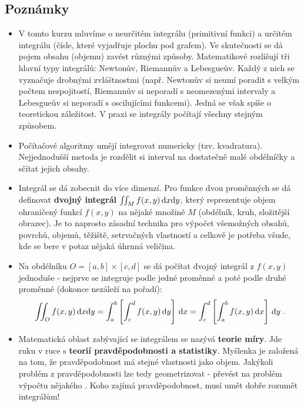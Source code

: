 \subsection*{Poznámky}

\begin{itemize}
    \item V tomto kurzu mluvíme o neurčitém integrálu (primitivní funkci) a určitém integrálu (čísle, které vyjadřuje plochu pod grafem). Ve skutečnosti se dá pojem obsahu (objemu) zavést různými způsoby. Matematikové rozlišují tři hlavní typy integrálů: Newtonův, Riemannův a Lebesgueův. Každý z nich se vyznačuje drobnými zvláštnostmi (např. Newtonův si neumí poradit s velkým počtem nespojitostí, Riemannův si neporadí s neomezenými intervaly a Lebesgueův si neporadí s oscilujícími funkcemi). Jedná se však spíše o teoretickou záležitost. V praxi se integrály počítají všechny stejným způsobem.
    \item Počítačové algoritmy umějí integrovat numericky (tzv. kvadratura). Nejjednodušší metoda je rozdělit si interval na dostatečně malé obdélníčky a sčítat jejich obsahy.
    \item Integrál se dá zobecnit do více dimenzí. Pro funkce dvou proměnných se dá definovat \textbf{dvojný integrál} $\iint_M f(x,y)\, \mathrm{d} x \mathrm{d} y$, který reprezentuje objem ohraničený funkcí $f(x,y)$ na nějaké množině $M$ (obdélník, kruh, složitější obrazec). Je to naprosto zásadní technika pro výpočet všemožných obsahů, povrchů, objemů, těžiště, setrvačných vlastností a celkově je potřeba všude, kde se bere v potaz nějaká úhrnná veličina.
    \item Na obdélníku $O = [a,b] \times [c,d]$ se dá počítat dvojný integrál z $f(x,y)$ jednoduše - nejprve se integruje podle jedné proměnné a poté podle druhé proměnné (dokonce nezáleží na pořadí):
    \begin{align}
        \iint_{O} f(x,y) \, \mathrm{d} x \mathrm{d} y = \int_a^b \left[ \int_c^d f(x,y) \, \mathrm{d} y \right] \, \mathrm{d} x = \int_c^d \left[ \int_a^b f(x,y) \, \mathrm{d} x \right] \, \mathrm{d} y \:.
    \end{align}
    \item Matematická oblast zabývající se integrálem se nazývá \textbf{teorie míry}. Jde ruku v ruce s \textbf{teorií pravděpodobnosti a statistiky}. Myšlenka je založená na tom, že pravděpodobnost má stejné vlastnosti jako objem. Jakýkoli problém z pravděpodobnosti lze tedy geometrizovat - převést na problém výpočtu nějakého . Koho zajímá pravděpodobnost, musí umět dobře rozumět integrálům!
\end{itemize}

